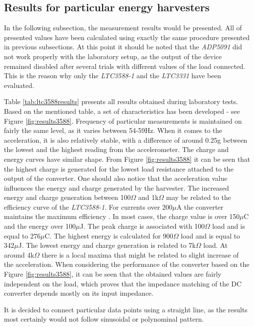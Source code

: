 \documentclass[12pt,a4paper]{article}
\begin{document}
\subsection{Results for particular energy harvesters}
In the following subsection, the measurement results would be presented. All of presented values have been calculated using exactly the same procedure presented in previous subsections. At this point it should be noted that the \textit{ADP5091} did not work properly with the laboratory setup, as the output of the device remained disabled after several trials with different values of the load connected. This is the reason why only the \textit{LTC3588-1} and the \textit{LTC3331} have been evaluated.
\par
Table \ref{tab:ltc3588results} presents all results obtained during laboratory tests. Based on the mentioned table, a set of characteristics has been developed - see Figure \ref{fig:results3588}. 
Frequency of particular measurements is maintained on fairly the same level, as it varies between 54-59Hz. When it comes to the acceleration, it is also relatively stable, with a difference of around 0.25g between the lowest and the highest reading from the accelerometer. The charge and energy curves have similar shape. From Figure \ref{fig:results3588} it can be seen that the highest charge is generated for the lowest load resistance attached to the output of the converter. One should also notice that the acceleration value influences the energy and charge generated by the harvester. The increased energy and charge generation between 100$\Omega$ and 1k$\Omega$ may be related to the efficiency curve of the \textit{LTC3588-1}. For currents over 200$\mu$A the converter maintains the maximum efficiency \cite{ltc3588_params}. In most cases, the charge value is over 150$\mu$C and the energy over 100$\mu$J. The peak charge is associated with 100$\Omega$ load and is equal to 276$\mu$C. The highest energy is calculated for 900$\Omega$ load and is equal to 342$\mu$J. The lowest energy and charge generation is related to 7k$\Omega$ load. At around 4k$\Omega$ there is a local maxima that might be related to slight increase of the acceleration. When considering the performance of the converter based on the Figure \ref{fig:results3588}, it can be seen that the obtained values are fairly independent on the load, which proves that the impedance matching of the DC converter depends mostly on its input impedance.
\par
It is decided to connect particular data points using a straight line, as the results most certainly would not follow sinusoidal or polynominal pattern.
\clearpage
\end{document}
